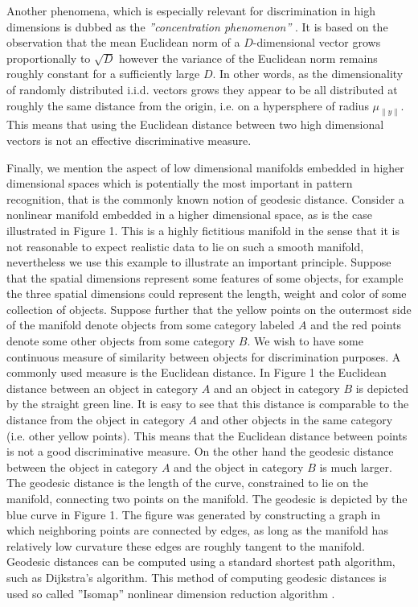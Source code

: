 \documentclass[12pt,a4paper]{article}
\begin{document}
Another phenomena, which is especially relevant for discrimination in high dimensions is dubbed as the \textit{''concentration phenomenon''} \cite{ManLearn}. It is based on the observation that the mean Euclidean norm of a $D$-dimensional vector grows proportionally to $\sqrt{D}$ however the variance of the Euclidean norm remains roughly constant for a sufficiently large $D$. In other words, as the dimensionality of randomly distributed i.i.d. vectors grows they appear to be all distributed at roughly the same distance from the origin, i.e. on a hypersphere of radius $\mu_{\|y\|}$. This means that using the Euclidean distance between two high dimensional vectors is not an effective discriminative measure.  

Finally, we mention the aspect of low dimensional manifolds embedded in higher dimensional spaces which is potentially the most important in pattern recognition, that is the commonly known notion of geodesic distance. Consider a nonlinear manifold embedded in a higher dimensional space, as is the case illustrated in Figure 1. This is a highly fictitious manifold in the sense that it is not reasonable to expect realistic data to lie on such a smooth manifold, nevertheless we use this example to illustrate an important principle. Suppose that the spatial dimensions represent some features of some objects, for example the three spatial dimensions could represent the length, weight and color of some collection of objects. Suppose further that the yellow points on the outermost side of the manifold denote objects from some category labeled $A$ and the red points denote some other objects from some category $B$. We wish to have some continuous measure of similarity between objects for discrimination purposes. A commonly used measure is the Euclidean distance. In Figure 1 the Euclidean distance between an object in category $A$ and an object in category $B$ is depicted by the straight green line. It is easy to see that this distance is comparable to the distance from the object in category $A$ and other objects in the same category (i.e. other yellow points). This means that the Euclidean distance between points is not a good discriminative measure. On the other hand the geodesic distance between the object in category $A$ and the object in category $B$ is much larger. The geodesic distance is the length of the curve, constrained to lie on the manifold, connecting two points on the manifold. The geodesic is depicted by the blue curve in Figure 1. The figure was generated by constructing a graph in which neighboring points are connected    
by edges, as long as the manifold has relatively low curvature these edges are roughly tangent to the manifold. Geodesic distances can be computed using a standard shortest path algorithm, such as Dijkstra's algorithm. This method of computing geodesic distances is used so called ''Isomap'' nonlinear dimension reduction algorithm \cite{Isomap}.    
\end{document}
